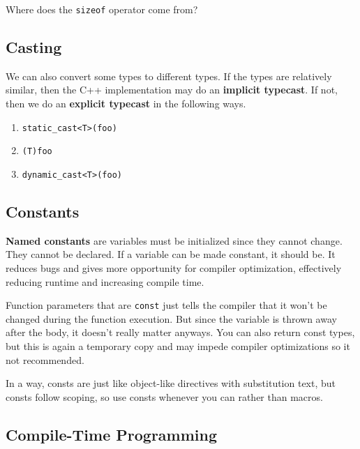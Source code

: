 \documentclass{article}
\begin{document}
  Where does the \texttt{sizeof} operator come from? 

  \subsection{Casting}

    We can also convert some types to different types. If the types are relatively similar, then the C++ implementation may do an \textbf{implicit typecast}. If not, then we do an \textbf{explicit typecast} in the following ways. 
    \begin{enumerate}
      \item \texttt{static\_cast<T>(foo)}
      \item \texttt{(T)foo} 
      \item \texttt{dynamic\_cast<T>(foo)}
    \end{enumerate} 

  \subsection{Constants}

    \textbf{Named constants} are variables must be initialized since they cannot change. They cannot be declared. If a variable can be made constant, it should be. It reduces bugs and gives more opportunity for compiler optimization, effectively reducing runtime and increasing compile time. 

    Function parameters that are \texttt{const} just tells the compiler that it won't be changed during the function execution. But since the variable is thrown away after the body, it doesn't really matter anyways. You can also return const types, but this is again a temporary copy and may impede compiler optimizations so it not recommended.  

    In a way, consts are just like object-like directives with substitution text, but consts follow scoping, so use consts whenever you can rather than macros.  

  \subsection{Compile-Time Programming} 
\end{document}
